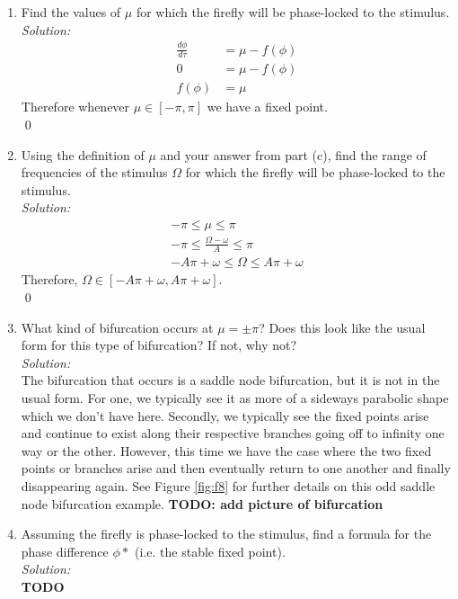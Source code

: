 \documentclass[10pt]{amsart}
\theoremstyle{nonumberplain}
\begin{document}
\begin{enumerate}[label={\bf {\arabic*}:}]
\begin{enumerate}
\item Find the values of $\mu$ for which the firefly will be phase-locked to the stimulus. \\
\textit{Solution:} \\
\begin{align*}
\frac {d \phi} {d \tau} &= \mu - f(\phi) \\
0 &= \mu - f(\phi) \\
f(\phi) &= \mu
\end{align*}
Therefore whenever $\mu \in [-\pi, \pi]$ we have a fixed point. \\
\qed \\

\item Using the definition of $\mu$ and your answer from part (c), find the range of
frequencies of the stimulus $\Omega$ for which the firefly will be phase-locked to the
stimulus. \\
\textit{Solution:} \\
\begin{align*}
-\pi \leq \mu \leq \pi \\
-\pi \leq \frac {\Omega - \omega} A \leq \pi \\
-A\pi + \omega \leq \Omega \leq A\pi + \omega
\end{align*}
Therefore, $\Omega \in [-A\pi + \omega, A\pi + \omega]$. \\
\qed \\

\item What kind of bifurcation occurs at $\mu = \pm \pi$? Does this look like the usual
form for this type of bifurcation? If not, why not? \\
\textit{Solution:} \\
The bifurcation that occurs is a saddle node bifurcation, but it is not in the usual form.
For one, we typically see it as more of a sideways parabolic shape which we don't have here.
Secondly, we typically see the fixed points arise and continue to exist along their respective branches going off to infinity one way or the other.
However, this time we have the case where the two fixed points or branches arise and then eventually return to one another and finally disappearing again.
See Figure \ref{fig:f8} for further details on this odd saddle node bifurcation example.
\textbf{TODO: add picture of bifurcation} \\

\item Assuming the firefly is phase-locked to the stimulus, find a formula for the
phase difference $\phi*$ (i.e. the stable fixed point). \\
\textit{Solution:} \\
\textbf{TODO} \\


\end{enumerate}
\end{enumerate}
\end{document}
